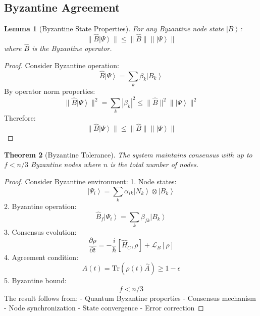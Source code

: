 \documentclass[12pt]{article}
\newcommand{\ket}[1]{\left|#1\right\rangle}
\newcommand{\tr}{\text{Tr}}
\newcommand{\op}[1]{\hat{#1}}
\newtheorem{theorem}{Theorem}[section]
\newtheorem{lemma}[theorem]{Lemma}
\begin{document}
\subsection{Byzantine Agreement}
\begin{lemma}[Byzantine State Properties]
For any Byzantine node state $\ket{B}$:
\begin{equation}
\|\op{B}\ket{\Psi}\| \leq \|\op{B}\|\|\ket{\Psi}\|
\end{equation}
where $\op{B}$ is the Byzantine operator.
\end{lemma}
\begin{proof}
Consider Byzantine operation:
\begin{equation}
\op{B}\ket{\Psi} = \sum_k \beta_k\ket{B_k}
\end{equation}
By operator norm properties:
\begin{equation}
\|\op{B}\ket{\Psi}\|^2 = \sum_k |\beta_k|^2 \leq \|\op{B}\|^2\|\ket{\Psi}\|^2
\end{equation}
Therefore:
\begin{equation}
\|\op{B}\ket{\Psi}\| \leq \|\op{B}\|\|\ket{\Psi}\|
\end{equation}
\end{proof}
\begin{theorem}[Byzantine Tolerance]
The system maintains consensus with up to $f < n/3$ Byzantine nodes where $n$ is the total number of nodes.
\end{theorem}
\begin{proof}
Consider Byzantine environment:
1. Node states:
\begin{equation}
\ket{\Psi_i} = \sum_k \alpha_{ik}\ket{N_k} \otimes \ket{B_k}
\end{equation}
2. Byzantine operation:
\begin{equation}
\op{B}_f\ket{\Psi_i} = \sum_k \beta_{fk}\ket{B_k}
\end{equation}
3. Consensus evolution:
\begin{equation}
\frac{\partial\rho}{\partial t} = -\frac{i}{\hbar}[\op{H}_C,\rho] + \mathcal{L}_B[\rho]
\end{equation}
4. Agreement condition:
\begin{equation}
A(t) = \tr(\rho(t)\op{A}) \geq 1 - \epsilon
\end{equation}
5. Byzantine bound:
\begin{equation}
f < n/3
\end{equation}
The result follows from:
- Quantum Byzantine properties
- Consensus mechanism
- Node synchronization
- State convergence
- Error correction
\end{proof}
\end{document}
